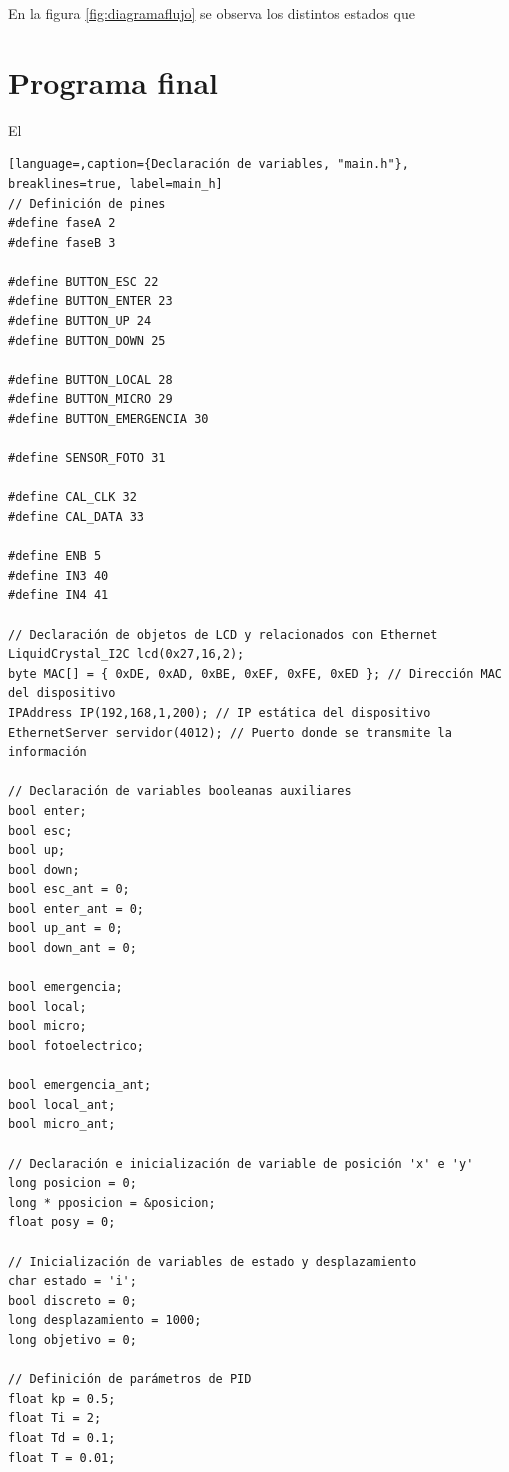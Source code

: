 En la figura \ref{fig:diagramaflujo} se observa los distintos estados que 

\section{Programa final}

El 



\begin{lstlisting}[language=,caption={Declaración de variables, "main.h"}, breaklines=true, label=main_h]
// Definición de pines
#define faseA 2
#define faseB 3

#define BUTTON_ESC 22
#define BUTTON_ENTER 23
#define BUTTON_UP 24
#define BUTTON_DOWN 25

#define BUTTON_LOCAL 28
#define BUTTON_MICRO 29
#define BUTTON_EMERGENCIA 30

#define SENSOR_FOTO 31

#define CAL_CLK 32
#define CAL_DATA 33

#define ENB 5
#define IN3 40
#define IN4 41

// Declaración de objetos de LCD y relacionados con Ethernet
LiquidCrystal_I2C lcd(0x27,16,2);
byte MAC[] = { 0xDE, 0xAD, 0xBE, 0xEF, 0xFE, 0xED }; // Dirección MAC del dispositivo
IPAddress IP(192,168,1,200); // IP estática del dispositivo
EthernetServer servidor(4012); // Puerto donde se transmite la información

// Declaración de variables booleanas auxiliares
bool enter;
bool esc;
bool up;
bool down;
bool esc_ant = 0;
bool enter_ant = 0;
bool up_ant = 0;
bool down_ant = 0;

bool emergencia;
bool local;
bool micro;
bool fotoelectrico;

bool emergencia_ant;
bool local_ant;
bool micro_ant;

// Declaración e inicialización de variable de posición 'x' e 'y'
long posicion = 0;
long * pposicion = &posicion;
float posy = 0;

// Inicialización de variables de estado y desplazamiento
char estado = 'i';
bool discreto = 0;
long desplazamiento = 1000;
long objetivo = 0;

// Definición de parámetros de PID
float kp = 0.5;
float Ti = 2;
float Td = 0.1;
float T = 0.01;
    
\end{lstlisting}

